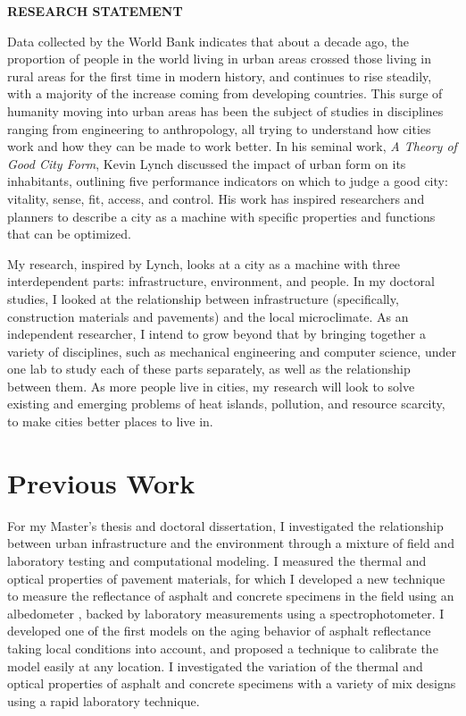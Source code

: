 \documentclass[12pt]{article}
\begin{document}
 \sloppy %

\begin{center}
{\large \uppercase{\textbf{Research Statement}}}
\end{center}

Data collected by the World Bank \cite{Urbanpop19:online} indicates that about a decade ago, the proportion of people in the world living in urban areas crossed those living in rural areas for the first time in modern history, and continues to rise steadily, with a majority of the increase coming from developing countries. This surge of humanity moving into urban areas has been the subject of studies in disciplines ranging from engineering to anthropology, all trying to understand how cities work and how they can be made to work better. In his seminal work, \textit{A Theory of Good City Form}, Kevin Lynch \cite{lynch1984good} discussed the impact of urban form on its inhabitants, outlining five performance indicators on which to judge a good city: vitality, sense, fit, access, and control. His work has inspired researchers and planners to describe a city as a machine \cite{molotch1976city, mcfarlane2011city, lloyd2001city, oke1973city} with specific properties and functions that can be optimized.

My research, inspired by Lynch, looks at a city as a machine with three interdependent parts: infrastructure, environment, and people. In my doctoral studies, I looked at the relationship between infrastructure (specifically, construction materials and pavements) and the local microclimate. As an independent researcher, I intend to grow beyond that by bringing together a variety of disciplines, such as mechanical engineering and computer science, under one lab to study each of these parts separately, as well as the relationship between them. As more people live in cities, my research will look to solve existing and emerging problems of heat islands, pollution, and resource scarcity, to make cities better places to live in.

\section*{Previous Work}
For my Master's thesis and doctoral dissertation, I investigated the relationship between urban infrastructure and the environment through a mixture of field and laboratory testing and computational modeling. I measured the thermal and optical properties of pavement materials, for which I developed a new technique to measure the reflectance of asphalt and concrete specimens in the field using an albedometer \cite{sen2018albedo}, backed by laboratory measurements using a spectrophotometer. I developed one of the first models on the aging behavior of asphalt reflectance \cite{sen2016aging} taking local conditions into account, and proposed a technique to calibrate the model easily at any location. I investigated the variation of the thermal and optical properties of asphalt and concrete specimens with a variety of mix designs using a rapid laboratory technique.
\end{document}
